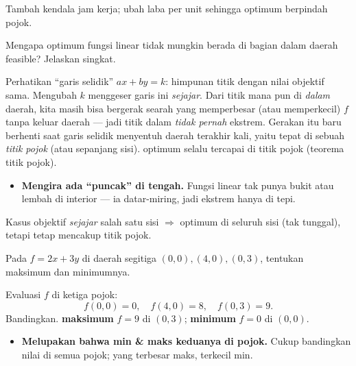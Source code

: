 \begin{variasi}
Tambah kendala jam kerja; ubah laba per unit sehingga optimum berpindah pojok.
\end{variasi}

\begin{soalbox}{}
Mengapa optimum fungsi linear tidak mungkin berada di bagian dalam daerah
feasible? Jelaskan singkat.
\end{soalbox}

\jawab
{} Perhatikan ``garis selidik'' $ax+by=k$: himpunan titik dengan nilai
objektif sama. Mengubah $k$ menggeser garis ini \emph{sejajar}.
 Dari titik mana pun di \emph{dalam} daerah, kita masih bisa bergerak
searah yang memperbesar (atau memperkecil) $f$ tanpa keluar daerah --- jadi titik
dalam \emph{tidak pernah} ekstrem.
 Gerakan itu baru berhenti saat garis selidik menyentuh daerah
terakhir kali, yaitu tepat di sebuah \emph{titik pojok} (atau sepanjang sisi).
\jadi optimum selalu tercapai di titik pojok (teorema titik pojok).

\begin{jebakan}
\begin{itemize}[leftmargin=*,topsep=2pt]
  \item \textbf{Mengira ada ``puncak'' di tengah.} Fungsi linear tak punya bukit
  atau lembah di interior --- ia datar-miring, jadi ekstrem hanya di tepi.
\end{itemize}
\end{jebakan}

\begin{variasi}
Kasus objektif \emph{sejajar} salah satu sisi $\Rightarrow$ optimum di seluruh
sisi (tak tunggal), tetapi tetap mencakup titik pojok.
\end{variasi}

\begin{soalbox}{}
Pada $f=2x+3y$ di daerah segitiga $(0,0),(4,0),(0,3)$, tentukan maksimum dan
minimumnya.
\end{soalbox}

\jawab
{} Evaluasi $f$ di ketiga pojok:
\[
f(0,0)=0,\quad f(4,0)=8,\quad f(0,3)=9.
\]
 Bandingkan.
\jadi \textbf{maksimum} $f=9$ di $(0,3)$; \textbf{minimum} $f=0$ di $(0,0)$.

\begin{jebakan}
\begin{itemize}[leftmargin=*,topsep=2pt]
  \item \textbf{Melupakan bahwa min \& maks keduanya di pojok.} Cukup bandingkan
  nilai di semua pojok; yang terbesar maks, terkecil min.
\end{itemize}
\end{jebakan}

